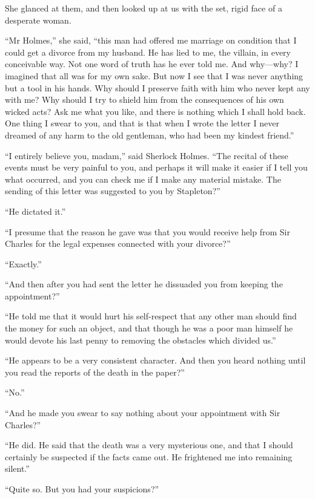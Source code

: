 \documentclass[paper=5.5in:8.5in,BCOR=7mm,twoside,DIV=calc,12pt,usegeometry,openany,chapterprefix,endperiod,headings=big]{scrbook} %
\begin{document}
She glanced at them, and then looked up at us with the set, rigid face of a desperate woman.

\enquote{Mr Holmes,} she said, \enquote{this man had offered me marriage on condition that I could get a divorce from my husband. He has lied to me, the villain, in every conceivable way. Not one word of truth has he ever told me. And why---why? I imagined that all was for my own sake. But now I see that I was never anything but a tool in his hands. Why should I preserve faith with him who never kept any with me? Why should I try to shield him from the consequences of his own wicked acts? Ask me what you like, and there is nothing which I shall hold back. One thing I swear to you, and that is that when I wrote the letter I never dreamed of any harm to the old gentleman, who had been my kindest friend.}

\enquote{I entirely believe you, madam,} said Sherlock Holmes. \enquote{The recital of these events must be very painful to you, and perhaps it will make it easier if I tell you what occurred, and you can check me if I make any material mistake. The sending of this letter was suggested to you by Stapleton?}

\enquote{He dictated it.}

\enquote{I presume that the reason he gave was that you would receive help from Sir Charles for the legal expenses connected with your divorce?}

\enquote{Exactly.}

\enquote{And then after you had sent the letter he dissuaded you from keeping the appointment?}

\enquote{He told me that it would hurt his self-respect that any other man should find the money for such an object, and that though he was a poor man himself he would devote his last penny to removing the obstacles which divided us.}

\enquote{He appears to be a very consistent character. And then you heard nothing until you read the reports of the death in the paper?}

\enquote{No.}

\enquote{And he made you swear to say nothing about your appointment with Sir Charles?}

\enquote{He did. He said that the death was a very mysterious one, and that I should certainly be suspected if the facts came out. He frightened me into remaining silent.}

\enquote{Quite so. But you had your suspicions?}
\end{document}
